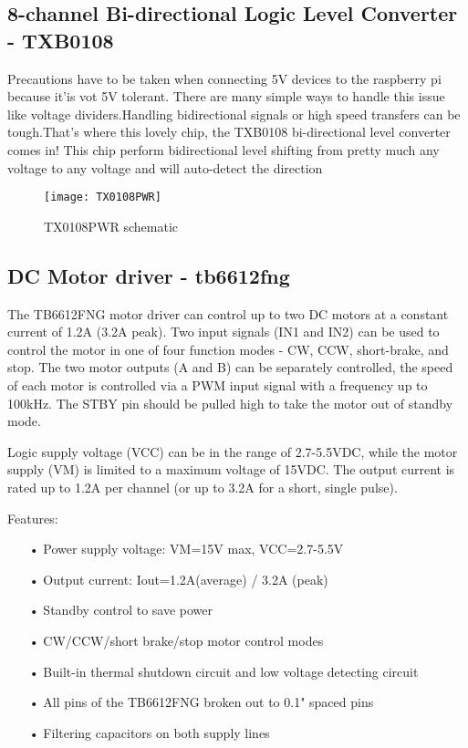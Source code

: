 \documentclass[
12pt, %
a4paper, %
oneside, %
headinclude,footinclude, %
BCOR5mm, %
]{scrartcl}
\begin{document}
\subsection{8-channel Bi-directional Logic Level Converter - TXB0108}
Precautions have to be taken when connecting 5V devices to the raspberry pi because it'is vot 5V tolerant. There are many simple ways to handle this issue like voltage dividers.Handling bidirectional signals or high speed transfers can be tough.That's where this lovely chip, the TXB0108 bi-directional level converter comes in! This chip perform bidirectional level shifting from pretty much any voltage to any voltage and will auto-detect the direction 

\begin{figure}[!htb]
\centering
\texttt{[image: TX0108PWR]} 
\caption[TX0108PWR schematic]{TX0108PWR schematic}
\label{fig:TX0108PWR}
\end{figure}

\subsection { DC Motor driver - tb6612fng }
The TB6612FNG motor driver can control up to two DC motors at a constant current of 1.2A (3.2A peak). Two input signals (IN1 and IN2) can be used to control the motor in one of four function modes - CW, CCW, short-brake, and stop. The two motor outputs (A and B) can be separately controlled, the speed of each motor is controlled via a PWM input signal with a frequency up to 100kHz. The STBY pin should be pulled high to take the motor out of standby mode.

Logic supply voltage (VCC) can be in the range of 2.7-5.5VDC, while the motor supply (VM) is limited to a maximum voltage of 15VDC. The output current is rated up to 1.2A per channel (or up to 3.2A for a short, single pulse).

Features:
\begin{itemize}
\item[•] Power supply voltage: VM=15V max, VCC=2.7-5.5V
\item[•] Output current: Iout=1.2A(average) / 3.2A (peak)
\item[•] Standby control to save power
\item[•] CW/CCW/short brake/stop motor control modes
\item[•] Built-in thermal shutdown circuit and low voltage detecting circuit
\item[•] All pins of the TB6612FNG broken out to 0.1" spaced pins
\item[•] Filtering capacitors on both supply lines
\end{itemize}
\end{document}

